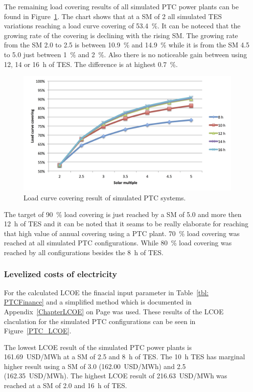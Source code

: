 The remaining load covering results of all simulated PTC power plants can be found in Figure~\ref{PTC_LCCF}. The chart shows that at a SM of 2 all simulated TES variations reaching a load curve covering of 53.4~\%. It can be noteced that the growing rate of the covering is declining with the rising SM. The growing rate from the SM 2.0 to 2.5 is between 10.9~\% and 14.9~\% while it is from the SM 4.5 to 5.0 just between 1~\% and 2~\%. Also there is no noticeable gain between using 12, 14 or \SI{16}{h} of TES. The difference is at highest 0.7~\%. 

\begin{figure}[htbp]  
\centering
\includegraphics[width=1\linewidth]{FIG/PTC_LCCF}
\caption[Load curve covering result of simulated PTC systems.]{Load curve covering result of simulated PTC systems.}\label{PTC_LCCF}
\end{figure}
The target of 90~\% load covering is just reached by a SM of 5.0 and more then \SI{12}{h} of TES and it can be noted that it seams to be really elaborate for reaching that high value of annual covering using a PTC plant. 70~\% load covering was reached at all simulated PTC configurations. While 80~\% load covering was reached by all configurations besides the \SI{8}{h} of TES.
\subsubsection{Levelized costs of electricity}
For the calculated LCOE the finacial input parameter in Table~\ref{tbl: PTCFinance} and a simplified method which is documented in Appendix~\ref{ChapterLCOE} on Page \pageref{ChapterLCOE} was used. These results of the LCOE claculation for the simulated PTC configurations can be seen in Figure~\ref{PTC_LCOE}. 

The lowest LCOE result of the simulated PTC power plants is \SI{161.69}{USD/MWh} at a SM of 2.5 and \SI{8}{h} of TES. The \SI{10}{h} TES has marginal higher result using a SM of 3.0 (\SI{162.00}{USD/MWh}) and 2.5 (\SI{162.35}{USD/MWh}). The highest LCOE result of \SI{216.63}{USD/MWh} was reached at a SM of 2.0 and \SI{16}{h} of TES. 

